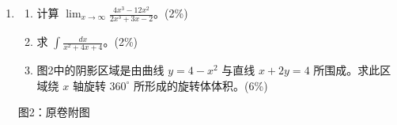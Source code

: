 \documentclass[12pt,a4paper]{exam-zh}
\begin{document}
\begin{enumerate}[leftmargin=2.2em,label=\arabic*.,start=10]
\item \begin{enumerate}[label=(\alph*),leftmargin=2em]
  \item 计算 $\displaystyle \lim_{x\to\infty}\frac{4x^3-12x^2}{2x^3+3x-2}$。\hfill (2\%)
  \item 求 $\displaystyle \int \frac{dx}{x^2+4x+4}$。\hfill (2\%)
  \item 图2中的阴影区域是由曲线 $y=4-x^2$ 与直线 $x+2y=4$ 所围成。求此区域绕 $x$ 轴旋转 $360^\circ$ 所形成的旋转体体积。\hfill (6\%)
\end{enumerate}

\vfill
\begin{flushright}图2：原卷附图\end{flushright}

\end{enumerate}
\end{document}
